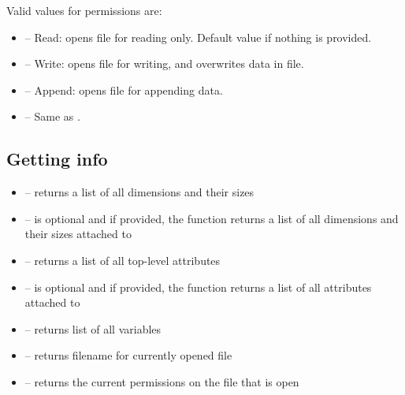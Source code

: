 \documentclass[a4paper,10pt,openany,english]{sphinxmanual}
\begin{document}
Valid values for permissions are:
\begin{itemize}
\item {} 
 -- Read: opens file for reading only. Default value if nothing is provided.

\item {} 
 -- Write: opens file for writing, and overwrites data in file.

\item {} 
 -- Append: opens file for appending data.

\item {} 
 -- Same as .

\end{itemize}


\subsection{Getting info}
\label{tutorial:getting-info}\begin{itemize}
\item {} 
 -- returns a list of all dimensions and their sizes

\item {} 
 --  is optional and if provided, the function returns a list of all dimensions and their sizes attached to 

\item {} 
 -- returns a list of all top-level attributes

\item {} 
 --  is optional and if provided, the function returns a list of all attributes attached to 

\item {} 
 -- returns list of all variables

\item {} 
 -- returns filename for currently opened file

\item {} 
 -- returns the current permissions on the file that is open

\end{itemize}
\end{document}
